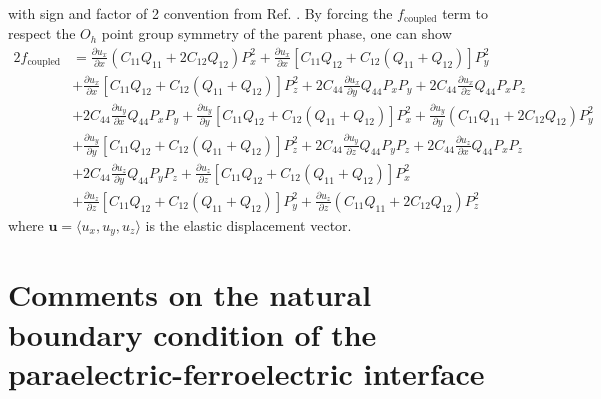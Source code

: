 \documentclass[22pt]{article} %
\begin{document}
%
with sign and factor of 2 convention from Ref. \cite{Li2001, Hlinka2006}. By forcing the $f_\mathrm{coupled}$ term to respect the $O_h$ point group symmetry of the parent phase, one can show
%
\begin{align}\nonumber
2 f_\mathrm{coupled} &= \frac{\partial u_x}{\partial x} \left(C_{11} Q_{11} + 2 C_{12} Q_{12} \right) P_x^2 + \frac{\partial u_x}{\partial x} \left[C_{11} Q_{12} + C_{12} \left(Q_{11} + Q_{12} \right)\right] P_y^2 \\ \nonumber
&+ \frac{\partial u_x}{\partial x} \left[C_{11} Q_{12} + C_{12} \left(Q_{11} + Q_{12} \right)\right] P_z^2 + 2 C_{44} \frac{\partial u_x}{\partial y} Q_{44} P_x P_y  + 2 C_{44} \frac{\partial u_x}{\partial z} Q_{44} P_x P_z\\ \nonumber
&+ 2 C_{44} \frac{\partial u_y}{\partial x} Q_{44} P_x P_y + \frac{\partial u_y}{\partial y} \left[C_{11} Q_{12} + C_{12} \left(Q_{11} + Q_{12} \right)\right] P_x^2 + \frac{\partial u_y}{\partial y} \left(C_{11} Q_{11} + 2 C_{12} Q_{12}\right) P_y^2 \\ \nonumber
&+ \frac{\partial u_y}{\partial y} \left[C_{11} Q_{12} + C_{12} \left(Q_{11} + Q_{12} \right)\right]  P_z^2 + 2 C_{44} \frac{\partial u_y}{\partial z} Q_{44} P_y P_z + 2 C_{44} \frac{\partial u_z}{\partial x} Q_{44} P_x P_z \\ \nonumber
&+ 2 C_{44} \frac{\partial u_z}{\partial y} Q_{44} P_y P_z + \frac{\partial u_z}{\partial z} \left[C_{11} Q_{12} + C_{12} \left(Q_{11} + Q_{12} \right)\right] P_x^2 \\ \nonumber
&+ \frac{\partial u_z}{\partial z} \left[C_{11} Q_{12} + C_{12} \left(Q_{11} + Q_{12} \right)\right] P_y^2 + \frac{\partial u_z}{\partial z} \left(C_{11} Q_{11} + 2 C_{12} Q_{12} \right) P_z^2
\end{align}
%
where $\textbf{u} = \langle u_x, u_y, u_z \rangle$ is the elastic displacement vector.
%

%
\section{Comments on the natural boundary condition of the paraelectric-ferroelectric interface}
%
\end{document}
